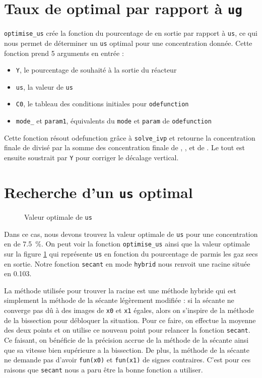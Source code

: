\documentclass[11pt]{report}
\begin{document}
    \section{Taux de  optimal par rapport à \texttt{ug}}
      \verb|optimise_us| crée la fonction du pourcentage de  en sortie par rapport à \verb|us|,
      ce qui nous permet de déterminer un \verb|us| optimal pour une concentration donnée.
      Cette fonction prend 5 arguments en entrée :
      \begin{itemize}
        \item \verb|Y|, le pourcentage de  souhaité à la sortie du réacteur
        \item \verb|us|, la valeur de \verb|us|
        \item \verb|C0|, le tableau des conditions initiales pour \verb|odefunction|
        \item \verb|mode_| et \verb|param1|, équivalents du \verb|mode| et \verb|param| de \verb|odefunction|
      \end{itemize}
      Cette fonction résout odefunction grâce à \verb|solve_ivp| et retourne la concentration
      finale de  divisé par la somme des concentration finale de , ,
       et de . Le tout est ensuite soustrait par \verb|Y| pour corriger le décalage vertical.
    \section{Recherche d'un \texttt{us} optimal}
      \begin{figure}[ht]
        \centering
        
        \caption{Valeur optimale de \texttt{us}}
        \label{graph:us}
      \end{figure}
      Dans ce cas, nous devons trouvez la valeur optimale de \verb|us| pour une concentration
      en  de \SI{7.5}{\percent}.
      On peut voir la fonction \verb|optimise_us| ainsi que la valeur optimale sur la figure \ref{graph:us}
      qui représente \verb|us| en fonction du pourcentage de  parmis les gaz secs en sortie.
      Notre fonction \verb|secant| en mode \verb|hybrid| nous renvoit une racine située en 0.103.
      \par
      La méthode utilisée pour trouver la racine est une méthode hybride qui est simplement
      la méthode de la sécante légèrement modifiée : si la sécante ne converge pas dû à des
      images de \verb|x0| et \verb|x1| égales,
      alors on s'inspire de la méthode de la bissection pour débloquer la situation.
      Pour ce faire, on effectue la moyenne des deux points et on utilise ce nouveau point pour relancer
      la fonction \verb|secant|. Ce faisant, on bénéficie de la précision accrue de la méthode de la sécante
      ainsi que sa vitesse bien supérieure a la bissection. De plus, la méthode de la sécante ne demande 
      pas d'avoir \verb|fun(x0)| et \verb|fun(x1)| de signes contraires. C'est pour ces raisons que \verb|secant| nous a 
      paru être la bonne fonction a utiliser.
\end{document}
